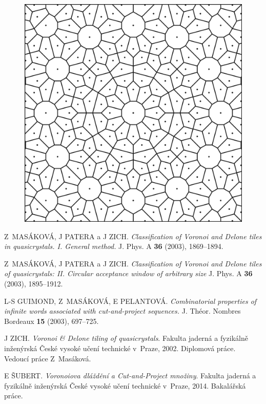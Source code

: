 \documentclass[a4paper,10pt,twoside]{article}
\theoremstyle{definition}
\theoremstyle{remark}
\begin{document}
\begin{figure}[h!]
\centering
\includegraphics[width=\textwidth]{dodecagon}
\end{figure}

\clearpage
\begin{thebibliography}{9}

	Z~MASÁKOVÁ, J PATERA a J ZICH. \emph{Classification of Voronoi and Delone tiles in quasicrystals. I. General method.} J. Phys. A \textbf{36} (2003), 1869--1894.

	Z~MASÁKOVÁ, J PATERA a J ZICH. \emph{Classification of Voronoi and Delone tiles of quasicrystals: II. Circular acceptance window of arbitrary size} J. Phys. A \textbf{36} (2003), 1895--1912.

	L-S GUIMOND, Z~MASÁKOVÁ, E PELANTOVÁ. \emph{Combinatorial properties of infinite words associated with cut-and-project
 sequences.} J. Théor. Nombres Bordeaux \textbf{15} (2003), 697--725.
	
	J ZICH. \emph{Voronoi \& Delone tiling of quasicrystals}. Fakulta jaderná a fyzikálně inženýrská České vysoké učení technické v~Praze, 2002. Diplomová práce. Vedoucí práce Z~Masáková.

	E ŠUBERT. \emph{Voronoiova dláždění a Cut-and-Project množiny}. Fakulta jaderná a fyzikálně inženýrská České vysoké učení technické v~Praze, 2014. Bakalářská práce.
	
\end{thebibliography}
\end{document}
